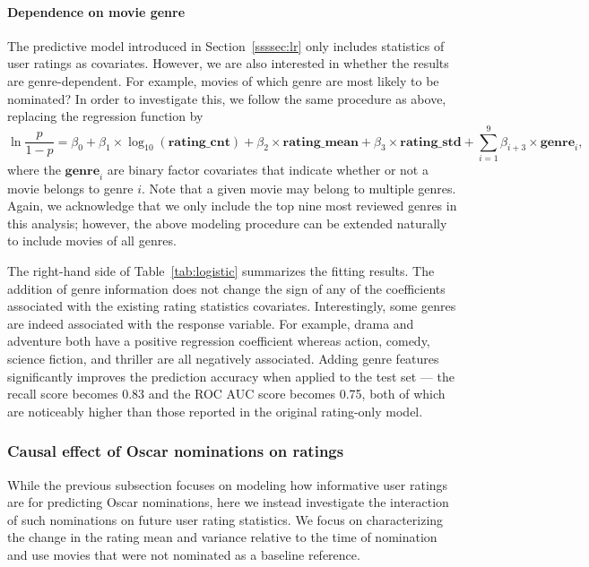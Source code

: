 \documentclass[dvipsnames]{article}
\begin{document}
\paragraph{Dependence on movie genre}

The predictive model introduced in Section~\ref{ssssec:lr} only includes statistics of user ratings as covariates. However, we are also interested in whether the results are genre-dependent. For example, movies of which genre are most likely to be nominated? In order to investigate this, we follow the same procedure as above, replacing the regression function by
%
\begin{equation}
    \ln \frac{p}{1-p} = \beta_0 + \beta_1 \times \log_{10}(\mathbf{rating}\_\mathbf{cnt}) + \beta_2 \times \mathbf{rating}\_\mathbf{mean} + \beta_3 \times \mathbf{rating}\_\mathbf{std} 
    + \sum_{i=1}^{9} \beta_{i+3} \times \mathbf{genre}_i , 
\end{equation}
%
where the $\mathbf{genre}_i$ are binary factor covariates that indicate whether or not a movie belongs to genre $i$. Note that a given movie may belong to multiple genres. Again, we acknowledge that we only include the top nine most reviewed genres in this analysis; however, the above modeling procedure can be extended naturally to include movies of all genres.

The right-hand side of Table~\ref{tab:logistic} summarizes the fitting results. The addition of genre information does not change the sign of any of the coefficients associated with the existing rating statistics covariates. Interestingly, some genres are indeed associated with the response variable. For example, drama and adventure both have a positive regression coefficient whereas action, comedy, science fiction, and thriller are all negatively associated. Adding genre features significantly improves the prediction accuracy when applied to the test set --- the recall score becomes 0.83 and the ROC AUC score becomes 0.75, both of which are noticeably higher than those reported in the original rating-only model.


\subsubsection{Causal effect of Oscar nominations on ratings}\label{sssec:ce}

While the previous subsection focuses on modeling how informative user ratings are for predicting Oscar nominations, here we instead investigate the interaction of such nominations on future user rating statistics. We focus on characterizing the change in the rating mean and variance relative to the time of nomination and use movies that were not nominated as a baseline reference.
\end{document}
